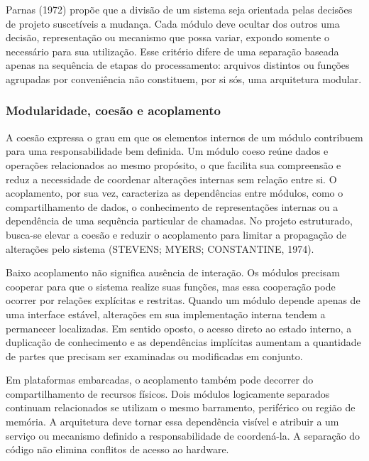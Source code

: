 \documentclass{article}
\begin{document}
Parnas (1972) prop\~oe que a divis\~ao de um sistema seja orientada pelas decis\~oes de projeto suscet\'iveis a mudan\c{c}a. Cada m\'odulo deve ocultar dos outros uma decis\~ao, representa\c{c}\~ao ou mecanismo que possa variar, expondo somente o necess\'ario para sua utiliza\c{c}\~ao. Esse crit\'erio difere de uma separa\c{c}\~ao baseada apenas na sequ\^encia de etapas do processamento: arquivos distintos ou fun\c{c}\~oes agrupadas por conveni\^encia n\~ao constituem, por si s\'os, uma arquitetura modular.


\subsubsection{Modularidade, coes\~ao e acoplamento}


A coes\~ao expressa o grau em que os elementos internos de um m\'odulo contribuem para uma responsabilidade bem definida. Um m\'odulo coeso re\'une dados e opera\c{c}\~oes relacionados ao mesmo prop\'osito, o que facilita sua compreens\~ao e reduz a necessidade de coordenar altera\c{c}\~oes internas sem rela\c{c}\~ao entre si. O acoplamento, por sua vez, caracteriza as depend\^encias entre m\'odulos, como o compartilhamento de dados, o conhecimento de representa\c{c}\~oes internas ou a depend\^encia de uma sequ\^encia particular de chamadas. No projeto estruturado, busca-se elevar a coes\~ao e reduzir o acoplamento para limitar a propaga\c{c}\~ao de altera\c{c}\~oes pelo sistema (STEVENS; MYERS; CONSTANTINE, 1974).


Baixo acoplamento n\~ao significa aus\^encia de intera\c{c}\~ao. Os m\'odulos precisam cooperar para que o sistema realize suas fun\c{c}\~oes, mas essa coopera\c{c}\~ao pode ocorrer por rela\c{c}\~oes expl\'icitas e restritas. Quando um m\'odulo depende apenas de uma interface est\'avel, altera\c{c}\~oes em sua implementa\c{c}\~ao interna tendem a permanecer localizadas. Em sentido oposto, o acesso direto ao estado interno, a duplica\c{c}\~ao de conhecimento e as depend\^encias impl\'icitas aumentam a quantidade de partes que precisam ser examinadas ou modificadas em conjunto.


Em plataformas embarcadas, o acoplamento tamb\'em pode decorrer do compartilhamento de recursos f\'isicos. Dois m\'odulos logicamente separados continuam relacionados se utilizam o mesmo barramento, perif\'erico ou regi\~ao de mem\'oria. A arquitetura deve tornar essa depend\^encia vis\'ivel e atribuir a um servi\c{c}o ou mecanismo definido a responsabilidade de coorden\'a-la. A separa\c{c}\~ao do c\'odigo n\~ao elimina conflitos de acesso ao hardware.
\end{document}
